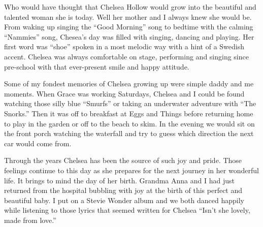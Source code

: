 Who would have thought that Chelsea Hollow would grow into the beautiful and
talented woman she is today. Well her mother and I always knew she would be.
From waking up singing the ``Good Morning'' song to bedtime with the calming
``Nammies'' song, Chesea's day was filled with singing, dancing and playing. Her
first word was “shoe” spoken in a most melodic way with a hint of a Swedish
accent. Chelsea was always comfortable on stage, performing and singing since
pre-school with that ever-present smile and happy attitude.

Some of my fondest memories of Chelsea growing up were simple daddy and me
moments. When Grace was working Saturdays, Chelsea and I could be found watching
those silly blue ``Smurfs'' or taking an underwater adventure with ``The Snorks.''
Then it was off to breakfast at Eggs and Things before returning home to play
in the garden or off to the beach to skim. In the evening we would sit on the
front porch watching the waterfall and try to guess which direction the next
car would come from. 

Through the years Chelsea has been the source of such joy and pride.  Those
feelings continue to this day as she prepares for the next journey in her
wonderful life. It brings to mind the day of her birth. Grandma Anna and I had
just returned from the hospital bubbling with joy at the birth of this perfect
and beautiful baby. I put on a Stevie Wonder album and we both danced happily
while listening to those lyrics that seemed written for Chelsea ``Isn’t she
lovely, made from love.''

\bigskip
